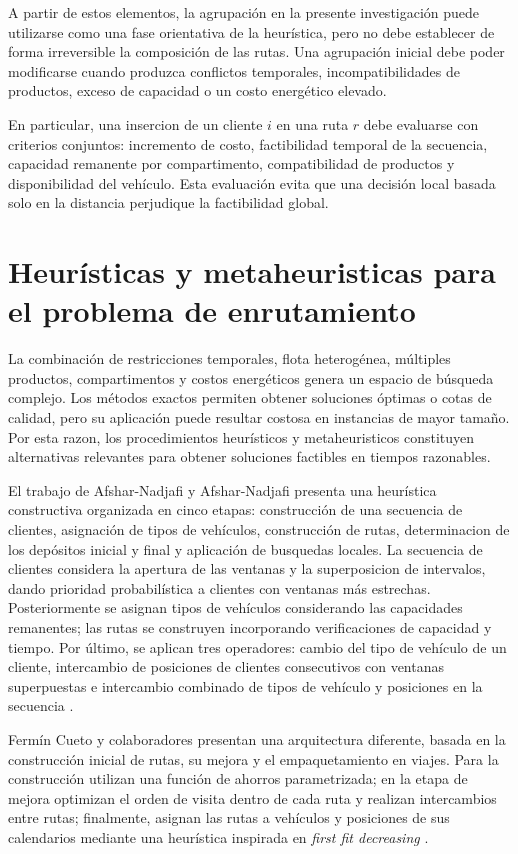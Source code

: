 A partir de estos elementos, la agrupación en la presente investigación puede utilizarse como una fase orientativa de la heurística, pero no debe establecer de forma irreversible la composición de las rutas. Una agrupación inicial debe poder modificarse cuando produzca conflictos temporales, incompatibilidades de productos, exceso de capacidad o un costo energético elevado.

En particular, una insercion de un cliente $i$ en una ruta $r$ debe evaluarse con criterios conjuntos: incremento de costo, factibilidad temporal de la secuencia, capacidad remanente por compartimento, compatibilidad de productos y disponibilidad del vehículo. Esta evaluación evita que una decisión local basada solo en la distancia perjudique la factibilidad global.

\section{Heurísticas y metaheuristicas para el problema de enrutamiento}
\label{sec:heurísticas}

La combinación de restricciones temporales, flota heterogénea, múltiples productos, compartimentos y costos energéticos genera un espacio de búsqueda complejo. Los métodos exactos permiten obtener soluciones óptimas o cotas de calidad, pero su aplicación puede resultar costosa en instancias de mayor tamaño. Por esta razon, los procedimientos heurísticos y metaheuristicos constituyen alternativas relevantes para obtener soluciones factibles en tiempos razonables.

El trabajo de Afshar-Nadjafi y Afshar-Nadjafi presenta una heurística constructiva organizada en cinco etapas: construcción de una secuencia de clientes, asignación de tipos de vehículos, construcción de rutas, determinacion de los depósitos inicial y final y aplicación de busquedas locales. La secuencia de clientes considera la apertura de las ventanas y la superposicion de intervalos, dando prioridad probabilística a clientes con ventanas más estrechas. Posteriormente se asignan tipos de vehículos considerando las capacidades remanentes; las rutas se construyen incorporando verificaciones de capacidad y tiempo. Por último, se aplican tres operadores: cambio del tipo de vehículo de un cliente, intercambio de posiciones de clientes consecutivos con ventanas superpuestas e intercambio combinado de tipos de vehículo y posiciones en la secuencia \cite{afshar2017}.

Fermín Cueto y colaboradores presentan una arquitectura diferente, basada en la construcción inicial de rutas, su mejora y el empaquetamiento en viajes. Para la construcción utilizan una función de ahorros parametrizada; en la etapa de mejora optimizan el orden de visita dentro de cada ruta y realizan intercambios entre rutas; finalmente, asignan las rutas a vehículos y posiciones de sus calendarios mediante una heurística inspirada en \textit{first fit decreasing} \cite{fermincueto2021}.

